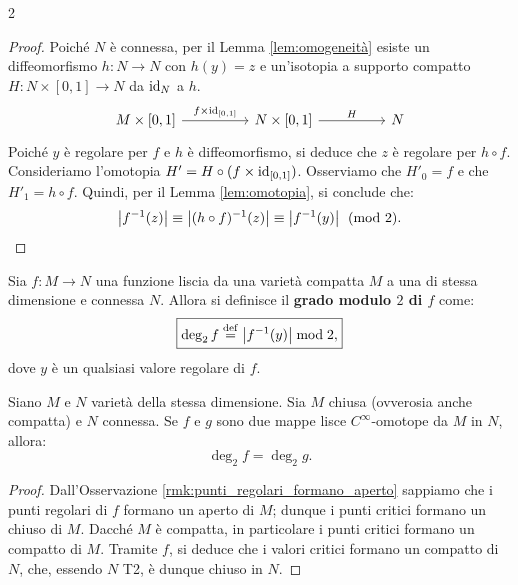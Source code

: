 \begin{multicols*}{2}
    \begin{proof}
        Poiché $N$ è connessa, per il Lemma \ref{lem:omogeneità} esiste un diffeomorfismo
        $h : N \to N$ con $h(y) = z$ e un'isotopia a supporto compatto
        $H : N \times [0, 1] \to N$ da $\operatorname{id}_N$ a $h$.
        \[\begin{tikzcd}
                {M \times [0, 1]} && {N \times [0, 1]} && N
                \arrow["{f \times \id_{[0, 1]}}", from=1-1, to=1-3]
                \arrow["H", from=1-3, to=1-5]
            \end{tikzcd}\]
        Poiché $y$ è regolare per $f$ e $h$ è diffeomorfismo, si deduce che
        $z$ è regolare per $h \circ f$. Consideriamo l'omotopia
        $H' = H \circ (f \times \operatorname{id}_{[0,1]})$. Osserviamo che
        $H'_0 = f$ e che $H'_1 = h \circ f$.
        Quindi, per il Lemma \ref{lem:omotopia}, si conclude che:
        \[
            \left\lvert f^{-1}(z) \right\rvert \equiv \left\lvert (h \circ f)^{-1}(z) \right\rvert \equiv \left\lvert f^{-1}(y) \right\rvert \pmod{2}.
        \]
    \end{proof}

    \begin{definition}
        Sia $f : M \to N$ una funzione liscia da una varietà compatta $M$
        a una di stessa dimensione e connessa $N$. Allora si definisce
        il \textbf{grado modulo $2$ di $f$} come:
        \[
            \boxed{\deg_2 f \overset{\mathrm{def}}{=} \left\lvert f^{-1}(y) \right\rvert \bmod 2,}
        \]
        dove $y$ è un qualsiasi valore regolare di $f$.
    \end{definition}

    \begin{theorem} \label{thm:fondamentale_grado_2}
        Siano $M$ e $N$ varietà della stessa dimensione. Sia $M$ chiusa (ovverosia
        anche compatta)
        e $N$ connessa. Se $f$ e $g$ sono due mappe lisce $C^\infty$-omotope da $M$ in $N$,
        allora:
        \[
            \boxed{\deg_2 f = \deg_2 g.}
        \]
    \end{theorem}

    \begin{proof}
        Dall'Osservazione \ref{rmk:punti_regolari_formano_aperto} sappiamo che
        i punti regolari di $f$ formano un aperto di $M$; dunque i punti critici
        formano un chiuso di $M$. Dacché $M$ è compatta, in particolare i punti
        critici formano un compatto di $M$. Tramite $f$, si deduce che i valori
        critici formano un compatto di $N$, che, essendo $N$ T2, è dunque
        chiuso in $N$. \smallskip


\end{proof}
\end{multicols*}
